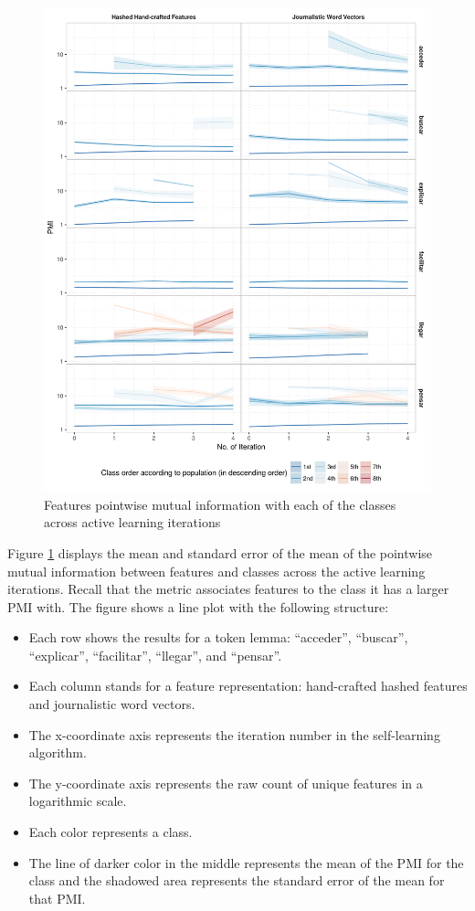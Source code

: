 \begin{figure}[htb!]
  \centering
  \includegraphics[height=0.9\textheight,width=\textwidth,keepaspectratio]
    {plots/active/features_pmi}
  \caption{Features pointwise mutual information with each of the classes
  across active learning iterations}
  \label{fig:active:pmi}
\end{figure}

Figure \ref{fig:active:pmi} displays the mean and standard error of the mean of
the pointwise mutual information between features and classes across the active
learning iterations. Recall that the metric associates features to the class it
has a larger PMI with. The figure shows a line plot with the following
structure:

\begin{itemize}
  \item Each row shows the results for a token lemma: ``acceder'', ``buscar'',
    ``explicar'', ``facilitar'', ``llegar'', and ``pensar''.
  \item Each column stands for a feature representation: hand-crafted hashed
    features and journalistic word vectors.
  \item The x-coordinate axis represents the iteration number in the
    self-learning algorithm.
  \item The y-coordinate axis represents the raw count of unique features in a
    logarithmic scale.
  \item Each color represents a class.
  \item The line of darker color in the middle represents the mean of the PMI
    for the class and the shadowed area represents the standard error of the
    mean for that PMI.
\end{itemize}

